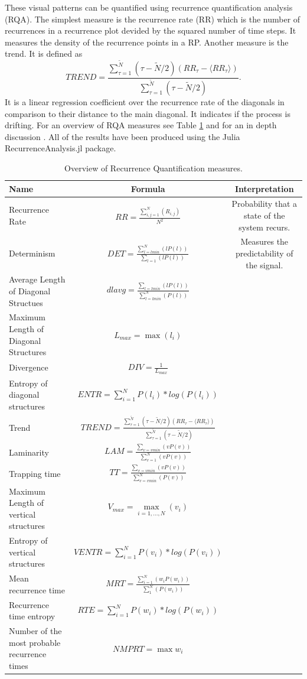 \documentclass{article}
\begin{document}
These visual patterns can be quantified using recurrence quantification analysis (RQA)\cite{Zbilut}.
The simplest measure is the recurrence rate (RR) which is the number of recurrences in a recurrence plot devided by the squared number of time steps.
It measures the density of the recurrence points in a RP.
Another measure is the trend.
It is defined as
$$ TREND= \frac{\sum_{\tau=1}^{\tilde{N}}(\tau - \tilde{N}/2)(RR_\tau - \langle RR_\tau \rangle)}{\sum_{\tau=1}^{\tilde{N}}(\tau - \tilde{N}/2)}.$$
It is a linear regression coefficient over the recurrence rate of the diagonals in comparison to their distance to the main diagonal.
It indicates if the process is drifting.
For an overview of RQA measures see  Table \ref{RQA_table} and for an in depth discussion \cite{Marwan06}.
All of the results have been produced using the Julia RecurrenceAnalysis.jl package\cite{RQA.jl}.

\begin{landscape}
\renewcommand{\arraystretch}{2}
\begin{table}[]
\begin{tabular}{@{}lcc@{}}
\toprule
 Name & Formula & Interpretation \\
 \midrule
 Recurrence Rate & $ RR= \frac{\sum\limits_{i,j=1}^N(R_{i,j})}{N^2} $ & Probability that a state of the system recurs.  \\
 Determinism & $DET=\frac{\sum\limits_{l=lmin}^N(l P(l))}{\sum_{l=1}(l P(l))} $ & Measures the predictability of the signal.   \\
 Average Length of Diagonal Structues & $dlavg=\frac{\sum_{l=lmin}(l P(l))}{\sum_{l=lmin}^{N}(P(l))}$  &  \\
 Maximum Length of Diagonal Structures & $L_{max}=\max(l_i)$ &  \\
 Divergence & $DIV=\frac{1}{L_{max}}$ &  \\
 Entropy of diagonal structures & $ENTR=\sum\limits_{i=1}^N P(l_i) * log(P(l_i))$ &  \\
 Trend & $ TREND=\frac{\sum_{\tau=1}^{\tilde{N}}(\tau - \tilde{N}/2)(RR_\tau - \langle RR_\tau \rangle)}{\sum_{\tau=1}^{\tilde{N}}(\tau - \tilde{N}/2)}$ &  \\
 Laminarity & $LAM=\frac{\sum_{v=vmin}(v P(v))}{\sum_{v=1}^{N}(v P(v))}$ &  \\
 Trapping time & $TT=\frac{\sum_{v=vmin}(v P(v))}{\sum_{v=vmin}^{N}(P(v))}$ &  \\
 Maximum Length of vertical structures & $V_{max}=\max\limits_{i=1, ..., N}(v_i)$ &  \\
 Entropy of vertical structures& $VENTR=\sum\limits_{i=1}^N P(v_i) * log(P(v_i))$ &  \\
 Mean recurrence time & $MRT=\frac{\sum\limits_{i=1}^N(w_i P(w_i))}{\sum_{1}^{N}(P(w_i))}$  &  \\
 Recurrence time entropy & $RTE =\sum\limits_{i=1}^N P(w_i) * log(P(w_i))$  & \\
 Number of the most probable recurrence times & $NMPRT=\max w_i$ & \\ \bottomrule
\end{tabular}
\caption{Overview of Recurrence Quantification measures.}
\label{RQA_table}
\end{table}
\end{landscape}
\end{document}
